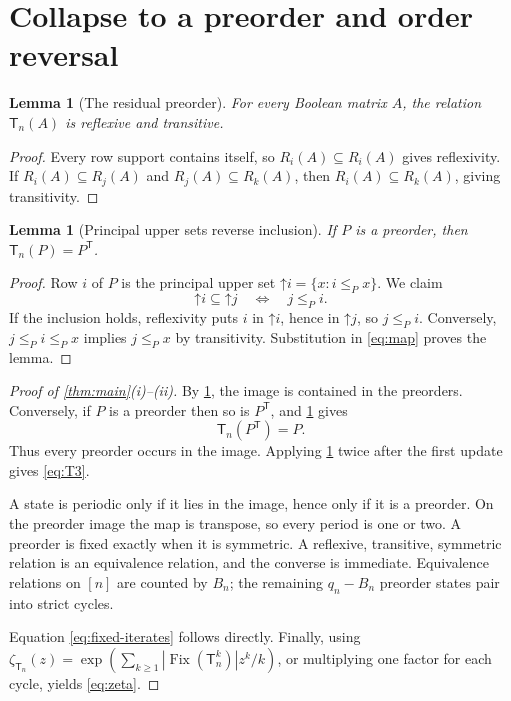\documentclass[10pt,a4paper]{amsart}
\newtheorem{lemma}[theorem]{Lemma}
\theoremstyle{definition}
\theoremstyle{remark}
\newcommand{\Fix}{\operatorname{Fix}}
\newcommand{\T}{\mathsf T}
\begin{document}
\section{Collapse to a preorder and order reversal}

\begin{lemma}[The residual preorder]\label{lem:preorder}
For every Boolean matrix $A$, the relation $\T_n(A)$ is reflexive and
transitive.
\end{lemma}

\begin{proof}
Every row support contains itself, so $R_i(A)\subseteq R_i(A)$ gives
reflexivity.  If $R_i(A)\subseteq R_j(A)$ and
$R_j(A)\subseteq R_k(A)$, then $R_i(A)\subseteq R_k(A)$, giving
transitivity.
\end{proof}

\begin{lemma}[Principal upper sets reverse inclusion]\label{lem:reverse}
If $P$ is a preorder, then $\T_n(P)=P^{\mathsf T}$.
\end{lemma}

\begin{proof}
Row $i$ of $P$ is the principal upper set
$\mathord{\uparrow}i=\{x:i\le_Px\}$.  We claim
\[
 \mathord{\uparrow}i\subseteq\mathord{\uparrow}j
 \quad\Longleftrightarrow\quad j\le_Pi.
\]
If the inclusion holds, reflexivity puts $i$ in
$\mathord{\uparrow}i$, hence in $\mathord{\uparrow}j$, so $j\le_Pi$.
Conversely, $j\le_Pi\le_Px$ implies $j\le_Px$ by transitivity.  Substitution
in \eqref{eq:map} proves the lemma.
\end{proof}

\begin{proof}[Proof of \cref{thm:main}(i)--(ii)]
By \cref{lem:preorder}, the image is contained in the preorders.  Conversely,
if $P$ is a preorder then so is $P^{\mathsf T}$, and
\cref{lem:reverse} gives
\[
                         \T_n(P^{\mathsf T})=P.
\]
Thus every preorder occurs in the image.  Applying
\cref{lem:reverse} twice after the first update gives \eqref{eq:T3}.

A state is periodic only if it lies in the image, hence only if it is a
preorder.  On the preorder image the map is transpose, so every period is one
or two.  A preorder is fixed exactly when it is symmetric.  A reflexive,
transitive, symmetric relation is an equivalence relation, and the converse
is immediate.  Equivalence relations on $[n]$ are counted by $B_n$; the
remaining $q_n-B_n$ preorder states pair into strict cycles.

Equation \eqref{eq:fixed-iterates} follows directly.  Finally, using
$\zeta_{\T_n}(z)=\exp(\sum_{k\geq1}|\Fix(\T_n^k)|z^k/k)$, or multiplying one
factor for each cycle, yields \eqref{eq:zeta}.
\end{proof}
\end{document}
